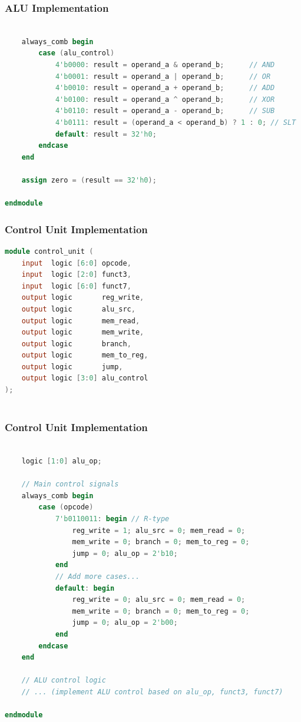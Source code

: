 \documentclass[aspectratio=169,xcolor=dvipsnames]{beamer}
\begin{document}
\begin{frame}[fragile]
\frametitle{ALU Implementation}
\begin{lstlisting}[language=Verilog]
    
    always_comb begin
        case (alu_control)
            4'b0000: result = operand_a & operand_b;      // AND
            4'b0001: result = operand_a | operand_b;      // OR
            4'b0010: result = operand_a + operand_b;      // ADD
            4'b0100: result = operand_a ^ operand_b;      // XOR
            4'b0110: result = operand_a - operand_b;      // SUB
            4'b0111: result = (operand_a < operand_b) ? 1 : 0; // SLT
            default: result = 32'h0;
        endcase
    end
    
    assign zero = (result == 32'h0);
    
endmodule
\end{lstlisting}
\end{frame}

\begin{frame}[fragile]
\frametitle{Control Unit Implementation}
\begin{lstlisting}[language=Verilog]
module control_unit (
    input  logic [6:0] opcode,
    input  logic [2:0] funct3,
    input  logic [6:0] funct7,
    output logic       reg_write,
    output logic       alu_src,
    output logic       mem_read,
    output logic       mem_write,
    output logic       branch,
    output logic       mem_to_reg,
    output logic       jump,
    output logic [3:0] alu_control
);
    
\end{lstlisting}
\end{frame}


\begin{frame}[fragile]
\frametitle{Control Unit Implementation}
\begin{lstlisting}[language=Verilog]
    
    logic [1:0] alu_op;
    
    // Main control signals
    always_comb begin
        case (opcode)
            7'b0110011: begin // R-type
                reg_write = 1; alu_src = 0; mem_read = 0;
                mem_write = 0; branch = 0; mem_to_reg = 0;
                jump = 0; alu_op = 2'b10;
            end
            // Add more cases...
            default: begin
                reg_write = 0; alu_src = 0; mem_read = 0;
                mem_write = 0; branch = 0; mem_to_reg = 0;
                jump = 0; alu_op = 2'b00;
            end
        endcase
    end
    
    // ALU control logic
    // ... (implement ALU control based on alu_op, funct3, funct7)
    
endmodule
\end{lstlisting}
\end{frame}
\end{document}

